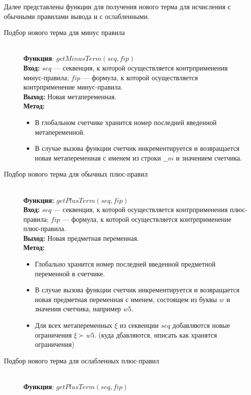 \documentclass{cw1}
\begin{document}
Далее представлены функции для получения нового терма для исчисления с обычными правилами вывода
и с ослабленными. 
\begin{description}
 \item[Подбор нового терма для минус правила] \qquad \\
    \textbf{Функция}: $getMinusTerm(seq,fip)$\\
    \textbf{Вход: }  $seq$ --- секвенция, к которой осуществляется контрприменения минус-правила;
    $fip$ --- формула, к которой осуществляется контрприменение минус-правила.\\
    \textbf{Выход:} Новая метапеременная.\\
    \textbf{Метод:}
    \begin{itemize}
    \item В глобальном счетчике хранится номер последней введенной метапеременной.
    \item В случае вызова функции счетчик инкрементируется и возвращается новая метапеременная
    с именем из строки $\_\_m$ и значением счетчика.
    \end{itemize}
  \item[Подбор нового терма для обычных плюс-правил] \qquad \\
    \textbf{Функция:} $getPlusTerm(seq,fip)$\\
    \textbf{Вход: }  $seq$ --- секвенция, к которой осуществляется контрприменения плюс-правила;
    $fip$ --- формула, к которой осуществляется контрприменение плюс-правила.\\
    \textbf{Выход:} Новая предметная переменная.\\
    \textbf{Метод:}
    \begin{itemize}
    \item Глобально хранится номер последней введенной предметной переменной в счетчике.
    \item В случае вызова функции счетчик инкрементируется и возвращается новая предметная
    переменная с именем, состоящем из буквы $w$ и значения счетчика, например $w5$.
    \item Для всех метапеременных $\xi$ из секвенции $seq$ добавляются новые ограничения $\xi \succ w5$.
    (куда дбавляются, нписать как хранятся ограничения)
    \end{itemize}
  \item [Подбор нового терма для ослабленных плюс-правил]\quad\\
    \textbf{Функция}: $getPlusTerm(seq,fip)$\\

\end{description}
\end{document}
